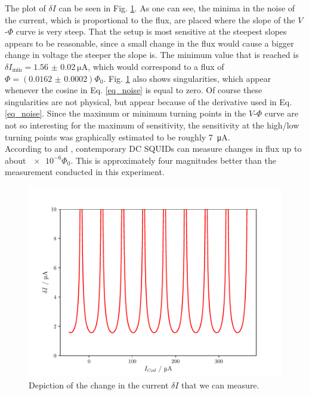 \documentclass[a4paper,10pt]{article}
\begin{document}
The plot of $\delta I$ can be seen in Fig. \ref{fig_noise}. As one can see, the minima in the noise of the current, which is proportional to the flux, are placed where the slope of the $V$-$\Phi$ curve is very steep. That the setup is most sensitive at the steepest slopes appears to be reasonable, since a small change in the flux would cause a bigger change in voltage the steeper the slope is. The minimum value that is reached is $\delta I_\mathrm{min} = \SI{1.56(2)}{\micro \ampere}$, which would correspond to a flux of $\Phi = (\num{0.0162(2)}) \Phi_0$. Fig. \ref{fig_noise} also shows singularities, which appear whenever the cosine in Eq. \ref{eq_noise} is equal to zero. Of course these singularities are not physical, but appear because of the derivative used in Eq. \ref{eq_noise}. Since the maximum or minimum turning points in the $V$-$\Phi$ curve are not so interesting for the maximum of sensitivity, the sensitivity at the high/low turning points was graphically estimated to be roughly \SI{7}{\micro \ampere}. 
\\
According to \cite{drung} and \cite{kleiner}, contemporary DC SQUIDs can measure changes in flux up to about $\num{e-6} \Phi_0$. This is approximately four magnitudes better than the measurement conducted in this experiment. 
\begin{figure}[htp!]
    \centering
    \includegraphics[width = 0.6 \textwidth]{noise.pdf}
    \caption{Depiction of the change in the current $\delta I$ that we can measure.}
    \label{fig_noise}
\end{figure}
\end{document}
